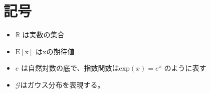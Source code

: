 \chapter*{記号}
\label{thanks}


\begin{itemize}
    \item $\mathbb{R}$ は実数の集合
    \item $\mathrm{E[x]}$ はxの期待値
    \item $e$ は自然対数の底で、指数関数は$\mathrm{exp}(x) = e^x$ のように表す
    \item $ \mathcal{G} $はガウス分布を表現する。
\end{itemize}